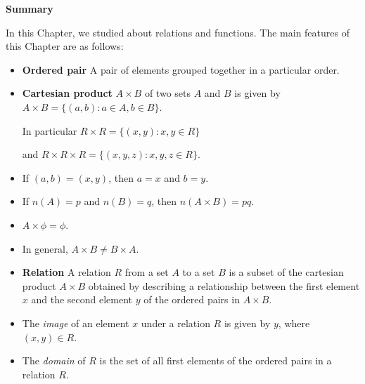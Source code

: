 \documentclass[11pt]{article}
\begin{document}
\vspace{0.5cm}
\begin{mdframed}[
  backgroundcolor=cyan!15,
  linecolor=cyan!40,
  linewidth=0pt,
  leftmargin=0pt,
  rightmargin=0pt,
  innerleftmargin=14pt,
  innerrightmargin=14pt,
  innertopmargin=12pt,
  innerbottommargin=12pt,
  skipabove=10pt,
  skipbelow=10pt
]

\begin{center}
{\large\bfseries\textcolor{cyan!60!black}{Summary}}
\end{center}

In this Chapter, we studied about relations and functions.
The main features of this Chapter are as follows:

\begin{itemize}[label=$\diamond$]

\item \textbf{Ordered pair}  
A pair of elements grouped together in a particular order.

\item \textbf{Cartesian product}  
$A \times B$ of two sets $A$ and $B$ is given by  
$A \times B = \{(a,b): a \in A, b \in B\}$.

In particular  
$R \times R = \{(x,y): x,y \in R\}$  

and  
$R \times R \times R = \{(x,y,z): x,y,z \in R\}$.

\item If $(a,b) = (x,y)$, then $a = x$ and $b = y$.

\item If $n(A) = p$ and $n(B) = q$, then $n(A \times B) = pq$.

\item $A \times \phi = \phi$.

\item In general, $A \times B \neq B \times A$.

\item \textbf{Relation}  
A relation $R$ from a set $A$ to a set $B$ is a subset of the cartesian product
$A \times B$ obtained by describing a relationship between the first element
$x$ and the second element $y$ of the ordered pairs in $A \times B$.

\item The \textit{image} of an element $x$ under a relation $R$ is given by $y$,
where $(x,y) \in R$.

\item The \textit{domain} of $R$ is the set of all first elements of the ordered
pairs in a relation $R$.


\end{itemize}
\end{mdframed}
\end{document}
